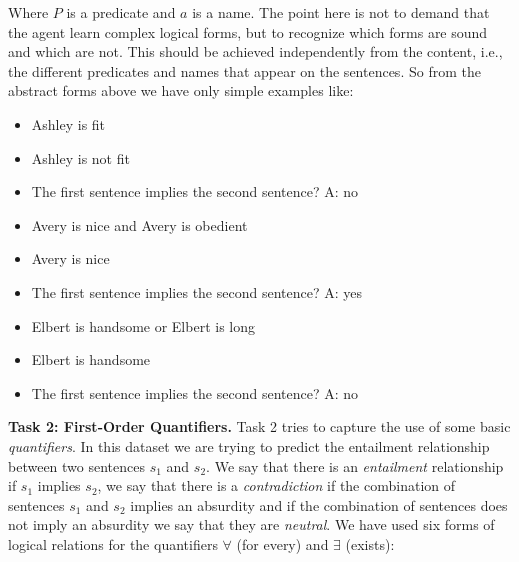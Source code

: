 Where $P$ is a predicate and $a$ is a name. The point here is not to demand that the agent learn complex logical forms, but to recognize which forms are sound and which are not. This should be achieved independently from the content, i.e., the different predicates and names that appear on the sentences. So from the abstract forms above we have only simple examples like:

\begin{itemize} 
\item[] Ashley is fit
\item[] Ashley is not fit
\item[] The first sentence implies the second sentence? A: no
\end{itemize}

\vspace{0.3cm}


\begin{itemize} 
\item[]Avery is nice and Avery is obedient
\item[]Avery is nice
\item[]The first sentence implies the second sentence? A: yes
\end{itemize}

\vspace{0.3cm}

\begin{itemize} 
\item[]Elbert is handsome or Elbert is long
\item[]Elbert is handsome
\item[]The first sentence implies the second sentence? A: no
\end{itemize}

\textbf{Task 2: First-Order Quantifiers.} Task 2 tries to capture the use of some basic \textit{quantifiers}. In this dataset we are trying to predict the entailment relationship between two sentences $s_1$ and $s_2$. We say that there is an \textit{entailment} relationship if $s_1$ implies $s_2$, we say that there is a \textit{contradiction} if the combination of sentences $s_1$ and $s_2$ implies an absurdity and if the combination of sentences does not imply an absurdity we say that they are \textit{neutral}. We have used six forms of logical relations for the quantifiers $\forall$ (for every) and $\exists$ (exists):

